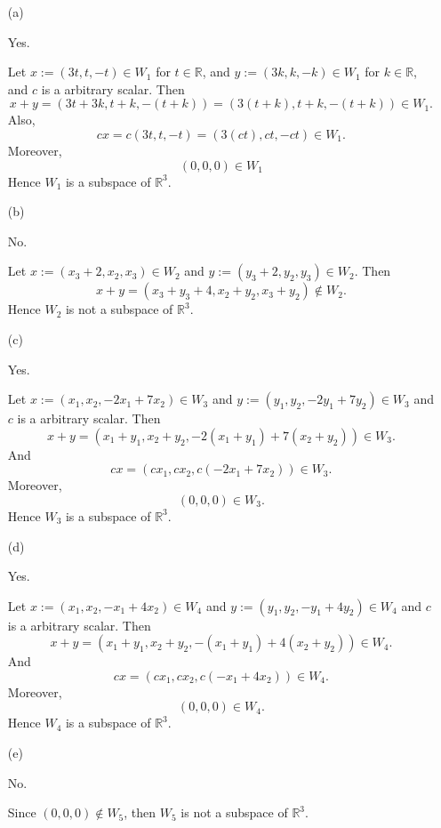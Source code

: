 \begin{Exercise} \label{ex:1.3.8}
\begin{enumerate}[(a)]
\item[(a)]
\begin{answer}
Yes.
\end{answer}
\begin{solution}
Let $x := (3t,t,-t)\in W_1$ for $t\in\mathbb{R}$, and $y := (3k,k,-k)\in W_1$ for $k\in\mathbb{R}$, and $c$ is a  arbitrary scalar. 
Then
$$
x+y
= (3t+3k,t+k,-(t+k))
= (3(t+k), t+k, -(t+k)) \in W_1.
$$
Also,
$$
c x
= c(3t,t,-t)
= (3(ct),ct,-ct) \in W_1.
$$
Moreover,
$$
(0,0,0) \in W_1
$$
Hence $W_1$ is a subspace of $\mathbb{R}^3$.
\end{solution}

\item[(b)]
\begin{answer}
No.
\end{answer}
\begin{solution}
Let $x := (x_3+2,x_2,x_3)\in W_2$ and $y := (y_3+2,y_2,y_3)\in W_2$. 
Then
$$
x+y
= (x_3+y_3+4, x_2+y_2,x_3+y_2) \notin W_2.
$$
Hence $W_2$ is not a subspace of $\mathbb{R}^3$.
\end{solution}

\item[(c)]
\begin{answer}
Yes.
\end{answer}
\begin{solution}
Let $x := (x_1,x_2,-2x_1+7x_2)\in W_3$ and $y := (y_1,y_2,-2y_1+7y_2)\in W_3$ and $c$ is a arbitrary scalar. Then
$$
x+y
= (x_1+y_1, x_2+y_2, -2(x_1+y_1)+7(x_2+y_2)) \in W_3.
$$
And
$$
c x
= (c x_1, c x_2, c(-2 x_1 + 7x_2)) \in W_3.
$$
Moreover,
$$
(0,0,0) \in W_3.
$$
Hence $W_3$ is a subspace of $\mathbb{R}^3$.
\end{solution}

\item[(d)]
\begin{answer}
Yes.
\end{answer}
\begin{solution}
Let $x := (x_1,x_2,-x_1+4x_2)\in W_4$ and $y := (y_1,y_2,-y_1+4y_2)\in W_4$ and $c$ is a arbitrary scalar. Then
$$
x+y
= (x_1+y_1, x_2+y_2, -(x_1+y_1)+4(x_2+y_2)) \in W_4.
$$
And
$$
c x
= (c x_1, c x_2, c(- x_1 + 4x_2)) \in W_4.
$$
Moreover,
$$
(0,0,0) \in W_4.
$$
Hence $W_4$ is a subspace of $\mathbb{R}^3$.
\end{solution}

\item[(e)]
\begin{answer}
No.
\end{answer}
\begin{solution}
Since $(0,0,0)\notin W_5$, then $W_5$ is not a subspace of $\mathbb{R}^3$.
\end{solution}


\end{enumerate}
\end{Exercise}
